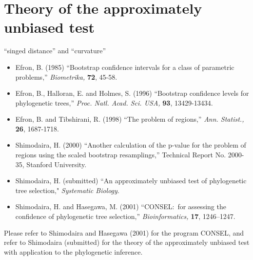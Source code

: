 \documentclass[12pt]{article}
\begin{document}
\section{Theory of the approximately unbiased test}

``singed distance'' and ``curvature''

\begin{itemize}
 \item Efron, B. (1985) ``Bootstrap confidence intervals for a class of
       parametric problems,'' {\it Biometrika,} {\bf 72}, 45-58.
 \item Efron, B., Halloran, E. and Holmes, S. (1996) ``Bootstrap
       confidence levels for phylogenetic
       trees,'' {\it Proc. Natl. Acad. Sci. USA,} {\bf 93}, 13429-13434.
 \item Efron, B. and Tibshirani, R. (1998) ``The problem of
       regions,'' {\it Ann. Statist.,} {\bf 26}, 1687-1718.
 \item Shimodaira, H. (2000) ``Another calculation of the p-value for the
       problem of regions using the scaled bootstrap
       resamplings,'' Technical Report No. 2000-35, Stanford University.
 \item Shimodaira, H. (submitted) ``An approximately unbiased test of
       phylogenetic tree selection," {\it Systematic Biology}.
 \item Shimodaira, H. and Hasegawa, M. (2001) ``CONSEL:~for assessing the
       confidence of phylogenetic tree selection,''  {\it
       Bioinformatics,} {\bf 17}, 1246--1247.
\end{itemize}

Please refer to Shimodaira and Hasegawa (2001) for the program CONSEL,
and refer to Shimodaira (submitted) for the theory of the approximately
unbiased test with application to the phylogenetic inference.
\end{document}
